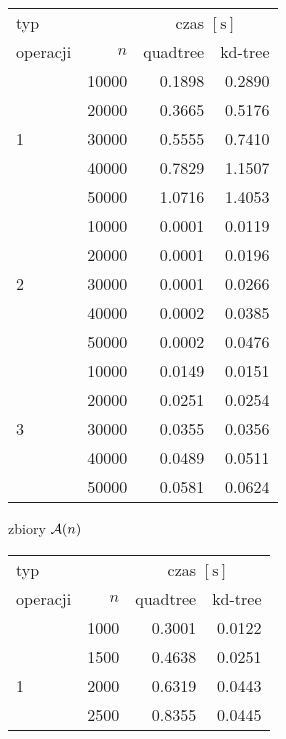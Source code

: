 \begin{table}
    \begin{subfigure}{0.5\textwidth}
        \centering
        \begin{tabular}{lrrr}
            \toprule
            typ & & \multicolumn{2}{c}{czas $[\mathrm{s}]$} \\
            operacji & $n$ & quadtree & kd-tree \\
            \midrule
            & 10000 & 0.1898 & 0.2890 \\
            & 20000 & 0.3665 & 0.5176 \\
            1 & 30000 & 0.5555 & 0.7410 \\
            & 40000 & 0.7829 & 1.1507 \\
            & 50000 & 1.0716 & 1.4053 \\
            \midrule
            & 10000 & 0.0001 & 0.0119 \\
            & 20000 & 0.0001 & 0.0196 \\
            2 & 30000 & 0.0001 & 0.0266 \\
            & 40000 & 0.0002 & 0.0385 \\
            & 50000 & 0.0002 & 0.0476 \\
            \midrule
            & 10000 & 0.0149 & 0.0151 \\
            & 20000 & 0.0251 & 0.0254 \\
            3 & 30000 & 0.0355 & 0.0356 \\
            & 40000 & 0.0489 & 0.0511 \\
            & 50000 & 0.0581 & 0.0624 \\
            \bottomrule
        \end{tabular}
        \caption{zbiory $\mathcal A(n)$}
        \label{tab:porównanie czasów A}
    \end{subfigure}
    \begin{subfigure}{0.5\textwidth}
        \centering
        \begin{tabular}{lrrr}
            \toprule
            typ & & \multicolumn{2}{c}{czas $[\mathrm{s}]$} \\
            operacji & $n$ & quadtree & kd-tree \\
            \midrule
            & 1000 & 0.3001 & 0.0122 \\
            & 1500 & 0.4638 & 0.0251 \\
            1 & 2000 & 0.6319 & 0.0443 \\
            & 2500 & 0.8355 & 0.0445 \\

\end{tabular}
\end{subfigure}
\end{table}
